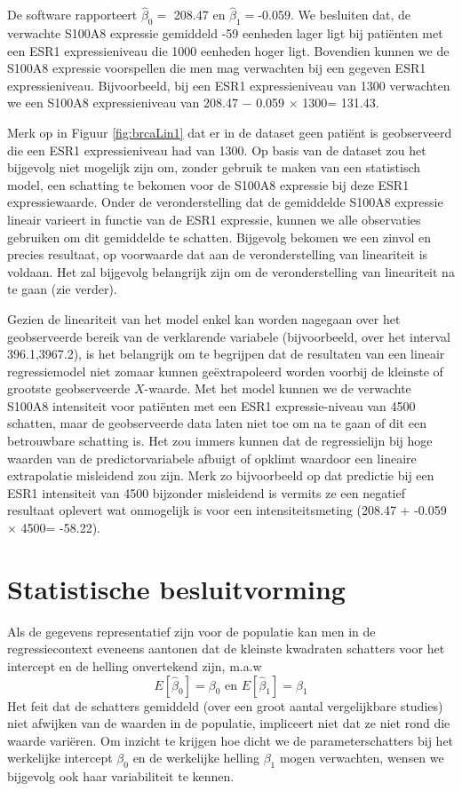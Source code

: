 \documentclass[12pt,dutch,coursenotes]{book}
\theoremstyle{definition}
\theoremstyle{definition}
\theoremstyle{definition}
\theoremstyle{remark}
\begin{document}
De software rapporteert \(\hat{\beta}_0=\) 208.47 en
\(\hat{\beta}_1=\)-0.059. We besluiten dat, de verwachte S100A8
expressie gemiddeld -59 eenheden lager ligt bij patiënten met een ESR1
expressieniveau die 1000 eenheden hoger ligt. Bovendien kunnen we de
S100A8 expressie voorspellen die men mag verwachten bij een gegeven ESR1
expressieniveau. Bijvoorbeeld, bij een ESR1 expressieniveau van 1300
verwachten we een S100A8 expressieniveau van 208.47 \(-\) 0.059
\(\times\) 1300= 131.43.

Merk op in Figuur \ref{fig:brcaLin1} dat er in de dataset geen patiënt
is geobserveerd die een ESR1 expressieniveau had van 1300. Op basis van
de dataset zou het bijgevolg niet mogelijk zijn om, zonder gebruik te
maken van een statistisch model, een schatting te bekomen voor de S100A8
expressie bij deze ESR1 expressiewaarde. Onder de veronderstelling dat
de gemiddelde S100A8 expressie lineair varieert in functie van de ESR1
expressie, kunnen we alle observaties gebruiken om dit gemiddelde te
schatten. Bijgevolg bekomen we een zinvol en precies resultaat, op
voorwaarde dat aan de veronderstelling van lineariteit is voldaan. Het
zal bijgevolg belangrijk zijn om de veronderstelling van lineariteit na
te gaan (zie verder).

Gezien de lineariteit van het model enkel kan worden nagegaan over het
geobserveerde bereik van de verklarende variabele (bijvoorbeeld, over
het interval 396.1,3967.2), is het belangrijk om te begrijpen dat de
resultaten van een lineair regressiemodel niet zomaar kunnen
geëxtrapoleerd worden voorbij de kleinste of grootste geobserveerde
\(X\)-waarde. Met het model kunnen we de verwachte S100A8 intensiteit
voor patiënten met een ESR1 expressie-niveau van 4500 schatten, maar de
geobserveerde data laten niet toe om na te gaan of dit een betrouwbare
schatting is. Het zou immers kunnen dat de regressielijn bij hoge
waarden van de predictorvariabele afbuigt of opklimt waardoor een
lineaire extrapolatie misleidend zou zijn. Merk zo bijvoorbeeld op dat
predictie bij een ESR1 intensiteit van 4500 bijzonder misleidend is
vermits ze een negatief resultaat oplevert wat onmogelijk is voor een
intensiteitsmeting (208.47 \(+\) -0.059 \(\times\) 4500= -58.22).

\section{Statistische besluitvorming}\label{sec:linBesluit}

Als de gegevens representatief zijn voor de populatie kan men in de
regressiecontext eveneens aantonen dat de kleinste kwadraten schatters
voor het intercept en de helling onvertekend zijn, m.a.w
\[E[\hat \beta_0]=\beta_0 \text{ en } E[\hat \beta_1]=\beta_1\] Het feit
dat de schatters gemiddeld (over een groot aantal vergelijkbare studies)
niet afwijken van de waarden in de populatie, impliceert niet dat ze
niet rond die waarde variëren. Om inzicht te krijgen hoe dicht we de
parameterschatters bij het werkelijke intercept \(\beta_0\) en de
werkelijke helling \(\beta_1\) mogen verwachten, wensen we bijgevolg ook
haar variabiliteit te kennen.
\end{document}
